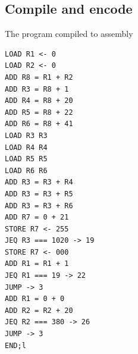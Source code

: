 \documentclass[a4paper, english]{article}
\numberwithin{equation}{section}
\begin{document}
\subsection{Compile and encode}
\begin{listing}[H]
    \centering
    \caption[short]{The program compiled to assembly}\label{lst:ass}
    \begin{verbatim}
LOAD R1 <- 0
LOAD R2 <- 0
ADD R8 = R1 + R2
ADD R3 = R8 + 1
ADD R4 = R8 + 20
ADD R5 = R8 + 22
ADD R6 = R8 + 41
LOAD R3 R3
LOAD R4 R4
LOAD R5 R5
LOAD R6 R6
ADD R3 = R3 + R4
ADD R3 = R3 + R5
ADD R3 = R3 + R6
ADD R7 = 0 + 21
STORE R7 <- 255
JEQ R3 === 1020 -> 19
STORE R7 <- 000
ADD R1 = R1 + 1
JEQ R1 === 19 -> 22
JUMP -> 3
ADD R1 = 0 + 0
ADD R2 = R2 + 20
JEQ R2 === 380 -> 26
JUMP -> 3
END;l
    \end{verbatim}
\end{listing}
\end{document}
